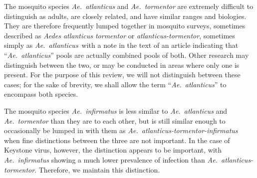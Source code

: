 \documentclass[12pt]{article}
\newcommand{\atl}{\textit{Ae.\ atlanticus}}
\begin{document}
                The mosquito species \textit{Ae.~atlanticus} and \textit{Ae.~tormentor} are extremely difficult to distinguish as adults, are closely related, and have similar ranges and biologies\cite{burkett2013mosquitoes}. They are therefore frequently lumped together in mosquito surveys, sometimes described as \textit{Aedes atlanticus tormentor}\cite{bond1966california} or \textit{atlanticus-tormentor}, sometimes simply as \atl\ with a note in the text of an article indicating that ``\atl'' pools are actually combined pools of both. Other research may distinguish between the two, or may be conducted in areas where only one is present. For the purpose of this review, we will not distinguish between these cases; for the sake of brevity, we shall allow the term ``\atl'' to encompass both species.

                The mosquito species \textit{Ae.~infirmatus} is less similar to \textit{Ae.~atlanticus} and \textit{Ae.~tormentor} than they are to each other, but is still similar enough to occasionally be lumped in with them as \textit{Ae.~atlanticus-tormentor-infirmatus} when fine distinctions between the three are not important. In the case of Keystone virus, however, the distinction appears to be important, with \textit{Ae.~infirmatus} showing a much lower prevalence of infection than \textit{Ae.~atlanticus-tormentor}.\cite{taylor1971california} Therefore, we maintain this distinction.
\end{document}
